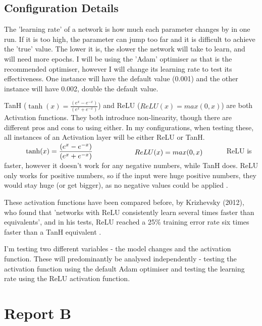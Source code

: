 \documentclass[a4paper, 11pt]{article}
\begin{document}
\subsection*{Configuration Details}
\ifx The 'learning rate' of a network is how much each parameter changes by in one run. If it is too high, the parameter can jump too far and it is difficult to achieve the 'true' value. The lower it is, the slower the network will take to learn, and will need more epochs. I will be using the 'Adam' optimiser as that is the recommended optimiser, however I will change its learning rate to test its effectiveness. One instance will have the default value (0.001) and the other instance will have 0.002, double the default value. \fi

TanH  (\(  \tanh (x) = \frac{ (e^x - e^{-x}) }{(e^x + e^{-x})}\)) and ReLU (\(  ReLU(x) = max(0,x)\)) are both Activation functions. They both introduce non-linearity, though there are different pros and cons to using either. In my configurations, when testing these, all instances of an Activation layer will be either ReLU or TanH.
\ifx
\begin{math}
\begin{minipage}{0.45\textwidth}
\[  \tanh (x) = \frac{ (e^x - e^{-x}) }{(e^x + e^{-x})}\]
\end{minipage}
\begin{minipage}{0.45\textwidth}
\[  ReLU(x) = max(0,x)\]
\end{minipage}
\end{math}
\fi
ReLU is faster, however it doesn't work for any negative numbers, while TanH does. ReLU only works for positive numbers, so if the input were huge positive numbers, they would stay huge (or get bigger), as no negative values could be applied \cite{CNN Lecture}.

These activation functions have been compared before, by Krizhevsky (2012), who found that 'networks with ReLU consistently learn several times faster than equivalents', and in his tests, ReLU reached a 25\% training error rate six times faster than a TanH equivalent \cite{Krizhevsky}.

\ifx I'm testing two different variables - the model changes and the activation function. These will predominantly be analysed independently - testing the activation function using the default Adam optimiser and testing the learning rate using the ReLU activation function.\fi

\section*{Report B}
\end{document}
